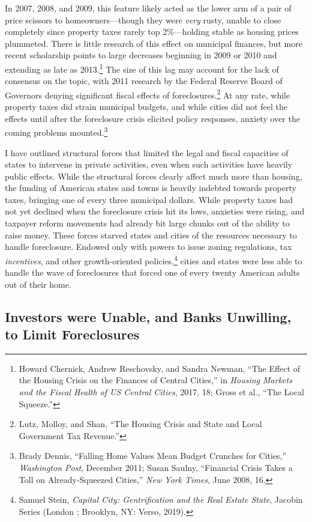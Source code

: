 \documentclass[12pt,oneside]{psthesis}
\begin{document}
In 2007, 2008, and 2009, this feature likely acted as the lower arm of a pair of price scissors to homeowners---though they were \emph{very} rusty, unable to close completely since property taxes rarely top 2\%---holding stable as housing prices plummeted.
There is little research of this effect on municipal finances, but more recent scholarship points to large decreases beginning in 2009 or 2010 and extending as late as 2013.\footnote{Howard Chernick, Andrew Reschovsky, and Sandra Newman, ``The Effect of the Housing Crisis on the Finances of Central Cities,'' in \emph{Housing Markets and the Fiscal Health of US Central Cities}, 2017, 18; Gross et al., ``The Local Squeeze.''}
The size of this lag may account for the lack of consensus on the topic, with 2011 research by the Federal Reserve Board of Governors denying significant fiscal effects of foreclosures.\footnote{Lutz, Molloy, and Shan, ``The Housing Crisis and State and Local Government Tax Revenue.''}
At any rate, while property taxes did strain municipal budgets, and while cities did not feel the effects until after the foreclosure crisis elicited policy responses, anxiety over the coming problems mounted.\footnote{Brady Dennis, ``Falling Home Values Mean Budget Crunches for Cities,'' \emph{Washington Post}, December 2011; Susan Saulny, ``Financial Crisis Takes a Toll on Already-Squeezed Cities,'' \emph{New York Times}, June 2008, 16.}

I have outlined structural forces that limited the legal and fiscal capacities of states to intervene in private activities, even when such activities have heavily public effects.
While the structural forces clearly affect much more than housing, the funding of American states and towns is heavily indebted towards property taxes, bringing one of every three municipal dollars.
While property taxes had not yet declined when the foreclosure crisis hit its lows, anxieties were rising, and taxpayer reform movements had already bit large chunks out of the ability to raise money.
These forces starved states and cities of the resources necessary to handle foreclosure.
Endowed only with powers to issue zoning regulations, tax \emph{incentives}, and other growth-oriented policies,\footnote{Samuel Stein, \emph{Capital City: Gentrification and the Real Estate State}, Jacobin Series (London ; Brooklyn, NY: Verso, 2019).} cities and states were less able to handle the wave of foreclosures that forced one of every twenty American adults out of their home.

\hypertarget{banks}{%
\subsection{Investors were Unable, and Banks Unwilling, to Limit Foreclosures}\label{banks}}
\end{document}
